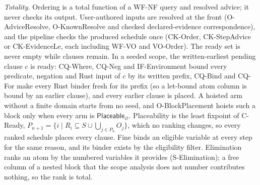 \emph{Totality.} Ordering is a total function of a WF-NF query and resolved
advice; it never checks its output. User-authored inputs are resolved at the
front (O-AdviceResolve, O-KnownResolve and checked declared-evidence correspondence), and the pipeline checks
the produced schedule once (CK-Order, CK-StepAdvice or CK-EvidenceLe, each
including WF-VO and VO-Order). The ready set is never empty while clauses
remain. In a seeded scope, the written-earliest pending clause $c$ is ready:
CQ-Where, CQ-Neg and IF-Environment bound every predicate, negation and Rust
input of $c$ by its written prefix, CQ-Bind and CQ-For make every Rust binder
fresh for its prefix (so a let-bound atom column is bound by an earlier
clause), and every earlier clause is placed. A hoisted arm without a finite
domain starts from no seed, and O-BlockPlacement hoists such a block only when
every arm is $\mathsf{Placeable}_\varnothing$. Placeability is the least
fixpoint of C-Ready, $P_{n+1}=\{i\mid R_i\subseteq S\cup\bigcup_{j\in P_n}O_j\}$,
which no ranking changes, so every ranked schedule places every clause. Fine
binds an eligible variable at every step for the same reason, and its binder
exists by the eligibility filter. Elimination ranks an atom by the numbered
variables it provides (S-Elimination); a free column of a nested block that
the scope analysis does not number contributes nothing, so the rank is total.
